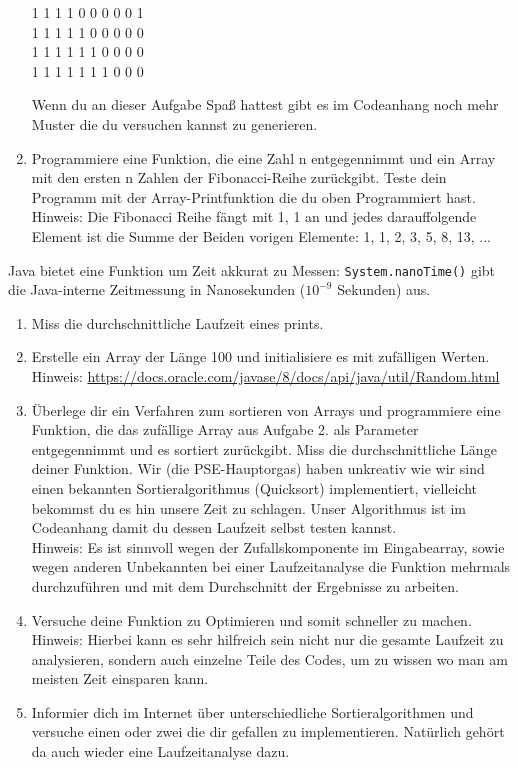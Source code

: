 \documentclass{../../sheet}
\begin{document}
\begin{enumerate}
\begin{ausgabe}
              1 1 1 1 0 0 0 0 0 1 \\
              1 1 1 1 1 0 0 0 0 0 \\
              1 1 1 1 1 1 0 0 0 0 \\
              1 1 1 1 1 1 1 0 0 0
          \end{ausgabe}
          Wenn du an dieser Aufgabe Spaß hattest gibt es im Codeanhang noch mehr Muster die du versuchen kannst zu generieren.
    \item Programmiere eine Funktion, die eine Zahl n entgegennimmt und ein Array mit den ersten n Zahlen der Fibonacci-Reihe zurückgibt. Teste dein Programm mit der Array-Printfunktion die du oben Programmiert hast.\\
          Hinweis: Die Fibonacci Reihe fängt mit 1, 1 an und jedes darauffolgende Element ist die Summe der Beiden vorigen Elemente: 1, 1, 2, 3, 5, 8, 13, ...

\end{enumerate}

\newpage
{}
Java bietet eine Funktion um Zeit akkurat zu Messen: \texttt{System.nanoTime()} gibt die Java-interne Zeitmessung in Nanosekunden ($10^{-9}$ Sekunden) aus.
\begin{enumerate}
    \item Miss die durchschnittliche Laufzeit eines prints.
    \item Erstelle ein Array der Länge 100 und initialisiere es mit zufälligen Werten. \\
          Hinweis: \url{https://docs.oracle.com/javase/8/docs/api/java/util/Random.html}
    \item Überlege dir ein Verfahren zum sortieren von Arrays und programmiere eine Funktion, die das zufällige Array aus Aufgabe 2. als Parameter entgegennimmt und es sortiert zurückgibt. Miss die durchschnittliche Länge deiner Funktion. Wir (die PSE-Hauptorgas) haben unkreativ wie wir sind einen bekannten Sortieralgorithmus (Quicksort) implementiert, vielleicht bekommst du es hin unsere Zeit zu schlagen. Unser Algorithmus ist im Codeanhang damit du dessen Laufzeit selbst testen kannst. \\
          Hinweis: Es ist sinnvoll wegen der Zufallskomponente im Eingabearray, sowie wegen anderen Unbekannten bei einer Laufzeitanalyse die Funktion mehrmals durchzuführen und mit dem Durchschnitt der Ergebnisse zu arbeiten.
    \item Versuche deine Funktion zu Optimieren und somit schneller zu machen. \\
          Hinweis: Hierbei kann es sehr hilfreich sein nicht nur die gesamte Laufzeit zu analysieren, sondern auch einzelne Teile des Codes, um zu wissen wo man am meisten Zeit einsparen kann.
    \item Informier dich im Internet über unterschiedliche Sortieralgorithmen und versuche einen oder zwei die dir gefallen zu implementieren. Natürlich gehört da auch wieder eine Laufzeitanalyse dazu.
\end{enumerate}
\end{document}
